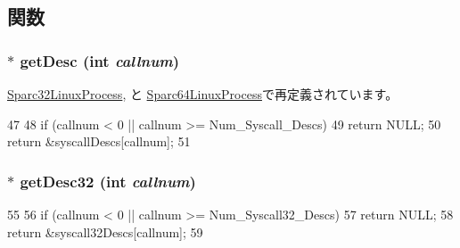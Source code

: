 \subsection{関数}
\hypertarget{classSparcISA_1_1SparcLinuxProcess_aebbff609a7235342925445690acf5ee8}{
\subsubsection[{getDesc}]{ $\ast$ getDesc (int {\em callnum})}}
\label{classSparcISA_1_1SparcLinuxProcess_aebbff609a7235342925445690acf5ee8}


\hyperlink{classSparcISA_1_1Sparc32LinuxProcess_a85e8ccf0c435d95c14574f0a217f5116}{Sparc32LinuxProcess}, と \hyperlink{classSparcISA_1_1Sparc64LinuxProcess_a85e8ccf0c435d95c14574f0a217f5116}{Sparc64LinuxProcess}で再定義されています。


\begin{DoxyCode}
47 {
48     if (callnum < 0 || callnum >= Num_Syscall_Descs)
49         return NULL;
50     return &syscallDescs[callnum];
51 }
\end{DoxyCode}
\hypertarget{classSparcISA_1_1SparcLinuxProcess_a5257a4aa8be7f323692245bc9de5bfa9}{
\subsubsection[{getDesc32}]{ $\ast$ getDesc32 (int {\em callnum})}}
\label{classSparcISA_1_1SparcLinuxProcess_a5257a4aa8be7f323692245bc9de5bfa9}



\begin{DoxyCode}
55 {
56     if (callnum < 0 || callnum >= Num_Syscall32_Descs)
57         return NULL;
58     return &syscall32Descs[callnum];
59 }
\end{DoxyCode}


